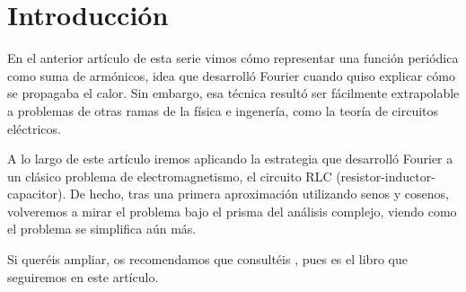 \section{Introducción}
En el anterior artículo de esta serie vimos cómo representar una
función periódica como suma de armónicos, idea que desarrolló Fourier
cuando quiso explicar cómo se propagaba el calor. Sin embargo, esa
técnica resultó ser fácilmente extrapolable a problemas de otras ramas
de la física e ingenería, como la teoría de circuitos eléctricos.

A lo largo de este artículo iremos aplicando la estrategia que desarrolló Fourier a un clásico problema de electromagnetismo, el circuito RLC (resistor-inductor-capacitor). De hecho, tras una primera aproximación utilizando senos y cosenos, volveremos a mirar el problema bajo el prisma del análisis complejo, viendo como el problema se simplifica aún más.

Si queréis ampliar, os recomendamos que consultéis \cite{Sadiku}, pues es el libro que seguiremos en este artículo.

